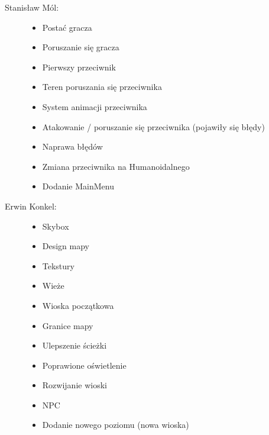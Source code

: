 \documentclass[10pt,a4paper]{article}
\begin{document}
\vspace{0.5cm}
\begin{description}
  \item[Stanisław Mól:] \hfill
  	\begin{itemize}
 	  \item Postać gracza
 	  \item Poruszanie się gracza
	  \item Pierwszy przeciwnik
	  \item Teren poruszania się przeciwnika
	  \item System animacji przeciwnika
	  \item Atakowanie / poruszanie się przeciwnika (pojawiły się błędy)
	  \item Naprawa błędów
	  \item Zmiana przeciwnika na Humanoidalnego
	  \item Dodanie MainMenu
	\end{itemize}
  \item[ Erwin Konkel:] \hfill
  	\begin{itemize}
          \item Skybox
  	  \item Design mapy
 	  \item Tekstury
  	  \item Wieże
	  \item Wioska początkowa
 	  \item Granice mapy
  	  \item Ulepszenie ścieżki 
  	  \item Poprawione oświetlenie
	  \item Rozwijanie wioski
	  \item NPC
	  \item Dodanie nowego poziomu (nowa wioska)
	\end{itemize}
\end{description}

\clearpage
\end{document}

